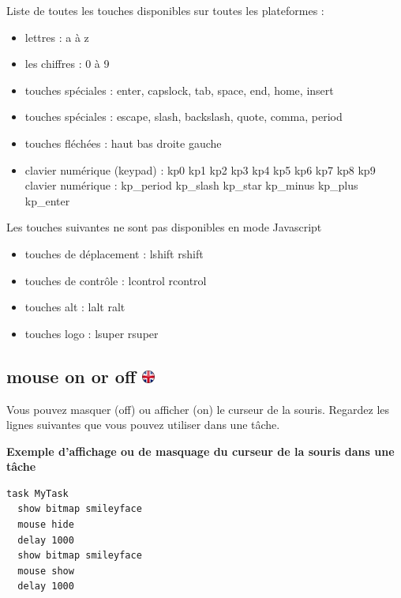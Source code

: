 \documentclass[
]{book}
\providecommand{\tightlist}{%
  \setlength{\itemsep}{0pt}\setlength{\parskip}{0pt}}
\begin{document}
Liste de toutes les touches disponibles sur toutes les plateformes :

\begin{itemize}
\tightlist
\item
  lettres : a à z
\item
  les chiffres : 0 à 9
\item
  touches spéciales : enter, capslock, tab, space, end, home, insert
\item
  touches spéciales : escape, slash, backslash, quote, comma, period
\item
  touches fléchées : haut bas droite gauche
\item
  clavier numérique (keypad) : kp0 kp1 kp2 kp3 kp4 kp5 kp6 kp7 kp8 kp9
  clavier numérique : kp\_period kp\_slash kp\_star kp\_minus kp\_plus
  kp\_enter
\end{itemize}

Les touches suivantes ne sont pas disponibles en mode Javascript

\begin{itemize}
\tightlist
\item
  touches de déplacement : lshift rshift
\item
  touches de contrôle : lcontrol rcontrol
\item
  touches alt : lalt ralt
\item
  touches logo : lsuper rsuper
\end{itemize}

\hypertarget{mouse-on-or-off}{%
\subsection[mouse on or off ]{\texorpdfstring{mouse on or off
\href{https://www.psytoolkit.org/doc3.2.0/syntax.html\#task-mouse}{\protect\includegraphics{img/ukflag.png}}}{mouse on or off }}\label{mouse-on-or-off}}

Vous pouvez masquer (off) ou afficher (on) le curseur de la souris.
Regardez les lignes suivantes que vous pouvez utiliser dans une tâche.

\textbf{Exemple d'affichage ou de masquage du curseur de la souris dans
une tâche}

\begin{verbatim}
task MyTask
  show bitmap smileyface
  mouse hide
  delay 1000
  show bitmap smileyface
  mouse show
  delay 1000
\end{verbatim}
\end{document}
